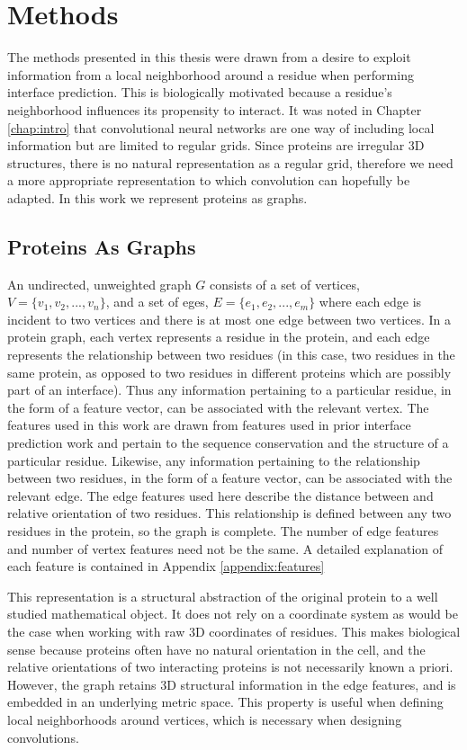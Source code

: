 \chapter{Methods}
\label{chap:methods}

The methods presented in this thesis were drawn from a desire to exploit information from a local neighborhood around a residue when performing interface prediction.
This is biologically motivated because a residue's neighborhood influences its propensity to interact.
It was noted in Chapter \ref{chap:intro} that convolutional neural networks are one way of including local information but are limited to regular grids. 
Since proteins are irregular 3D structures, there is no natural representation as a regular grid, therefore we need a more appropriate representation to which convolution can hopefully be adapted.
In this work we represent proteins as graphs.


\section{Proteins As Graphs}

An undirected, unweighted graph $G$ consists of a set of vertices, $V=\{v_1, v_2, ..., v_n\}$, and a set of eges, $E=\{e_1, e_2, ..., e_m\}$ where each edge is incident to two vertices and there is at most one edge between two vertices.
In a protein graph, each vertex represents a residue in the protein, and each edge represents the relationship between two residues (in this case, two residues in the same protein, as opposed to two residues in different proteins which are possibly part of an interface).
Thus any information pertaining to a particular residue, in the form of a feature vector, can be associated with the relevant vertex.
The features used in this work are drawn from features used in prior interface prediction work \cite{minhas2014} and pertain to the sequence conservation and the structure of a particular residue. 
Likewise, any information pertaining to the relationship between two residues, in the form of a feature vector, can be associated with the relevant edge.
The edge features used here describe the distance between and relative orientation of two residues.
This relationship is defined between any two residues in the protein, so the graph is complete. 
The number of edge features and number of vertex features need not be the same.
A detailed explanation of each feature is contained in Appendix \ref{appendix:features}

This representation is a structural abstraction of the original protein to a well studied mathematical object.
It does not rely on a coordinate system as would be the case when working with raw 3D coordinates of residues.
This makes biological sense because proteins often have no natural orientation in the cell, and the relative orientations of two interacting proteins is not necessarily known a priori.
However, the graph retains 3D structural information in the edge features, and is embedded in an underlying metric space. 
This property is useful when defining local neighborhoods around vertices, which is necessary when designing convolutions.

